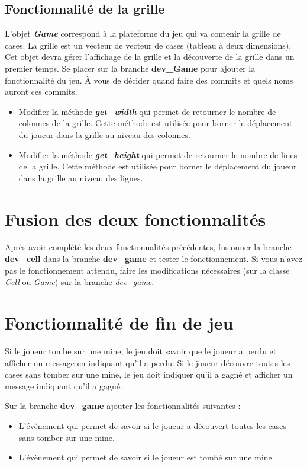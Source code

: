 \subsection{Fonctionnalité de la grille}
L'objet \textit{\textbf{Game}} correspond à la plateforme du jeu qui va contenir la grille de cases. La grille est un vecteur de vecteur de cases (tableau à deux dimensions). Cet objet devra gérer l'affichage de la grille et la découverte de la grille dans un premier temps. Se placer sur la branche \textbf{dev\_Game} pour ajouter la fonctionnalité du jeu. À vous de décider quand faire des commits et quels noms auront ces commits.

\medskip

\begin{itemize}
    \item Modifier la méthode \textit{\textbf{get\_width}} qui permet de retourner le nombre de colonnes de la grille. Cette méthode est utilisée pour borner le déplacement du joueur dans la grille au niveau des colonnes.
    \medskip
    \item Modifier la méthode \textit{\textbf{get\_height}} qui permet de retourner le nombre de lines de la grille. Cette méthode est utilisée pour borner le déplacement du joueur dans la grille au niveau des lignes.
\end{itemize}


\medskip

\section{Fusion des deux fonctionnalités}
Après avoir complété les deux fonctionnalités précédentes, fusionner la branche \textbf{dev\_cell} dans la branche \textbf{dev\_game} et tester le fonctionnement. Si vous n'avez pas le fonctionnement attendu, faire les modifications nécessaires (sur la classe \textit{Cell} ou \textit{Game}) sur la branche \textit{dev\_game}.

\section{Fonctionnalité de fin de jeu}
Si le joueur tombe sur une mine, le jeu doit savoir que le joueur a perdu et afficher un message en indiquant qu'il a perdu. Si le joueur découvre toutes les cases sans tomber sur une mine, le jeu doit indiquer qu'il a gagné et afficher un message indiquant qu'il a gagné.

\medskip

Sur la branche \textbf{dev\_game} ajouter les fonctionnalités suivantes : 
\begin{itemize}
    \item L'évènement qui permet de savoir si le joueur a découvert toutes les cases sans tomber sur une mine.
    \item L'évènement qui permet de savoir si le joueur est tombé sur une mine.
\end{itemize}

